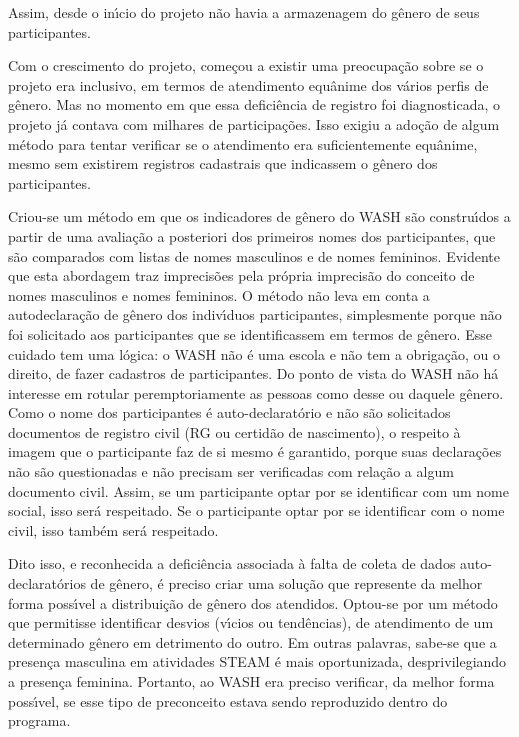 \documentclass[
12pt,		%
openright,	%
twoside,  %
a4paper,			%
chapter=TITLE,		%
english,			%
french,				%
spanish,			%
brazil				%
]{USPSC-classe/USPSC}
\begin{document}
Assim, desde o in\'{\i}cio do projeto n\~ao havia a armazenagem do g\^enero de seus participantes.




Com o crescimento do projeto, come\c{c}ou a existir uma preocupa\c{c}\~ao sobre se o projeto era inclusivo, em termos de atendimento equ\^anime dos v\'arios perfis de g\^enero. Mas no momento em que essa defici\^encia de registro foi diagnosticada, o projeto j\'a contava com milhares de participa\c{c}\~oes. Isso exigiu a ado\c{c}\~ao de algum m\'etodo para tentar verificar se o atendimento era suficientemente equ\^anime, mesmo sem existirem registros cadastrais que indicassem o g\^enero dos participantes.




Criou-se um m\'etodo em que os indicadores de g\^enero do WASH s\~ao constru\'{\i}dos a partir de uma avalia\c{c}\~ao a posteriori dos primeiros nomes dos participantes, que s\~ao comparados com listas de nomes masculinos e de nomes femininos. Evidente que esta abordagem traz imprecis\~oes pela pr\'opria imprecis\~ao do conceito de nomes masculinos e nomes femininos. O m\'etodo n\~ao leva em conta a autodeclara\c{c}\~ao de g\^enero dos indiv\'{\i}duos participantes, simplesmente porque n\~ao foi solicitado aos participantes que se identificassem em termos de g\^enero. Esse cuidado tem uma l\'ogica: o WASH n\~ao \'e uma escola e n\~ao tem a obriga\c{c}\~ao, ou o direito, de fazer cadastros de participantes. Do ponto de vista do WASH n\~ao h\'a interesse em rotular peremptoriamente as pessoas como desse ou daquele g\^enero. Como o nome dos participantes \'e auto-declarat\'orio e n\~ao s\~ao solicitados documentos de registro civil (RG ou certid\~ao de nascimento), o respeito \`a imagem que o participante faz de si mesmo \'e garantido, porque suas declara\c{c}\~oes n\~ao s\~ao questionadas e n\~ao precisam ser verificadas com rela\c{c}\~ao a algum documento civil. Assim, se um participante optar por se identificar com um nome social, isso ser\'a respeitado. Se o participante optar por se identificar com o nome civil, isso tamb\'em ser\'a respeitado.




Dito isso, e reconhecida a defici\^encia associada \`a falta de coleta de dados auto-declarat\'orios de g\^enero, \'e preciso criar uma solu\c{c}\~ao que represente da melhor forma poss\'{\i}vel a distribui\c{c}\~ao de g\^enero dos atendidos. Optou-se por um m\'etodo que permitisse identificar desvios (v\'{\i}cios ou tend\^encias), de atendimento de um determinado g\^enero em detrimento do outro. Em outras palavras, sabe-se que a presen\c{c}a masculina em atividades STEAM \'e mais oportunizada, desprivilegiando a presen\c{c}a feminina. Portanto, ao WASH era preciso verificar, da melhor forma poss\'{\i}vel, se esse tipo de preconceito estava sendo reproduzido dentro do programa.
\end{document}
